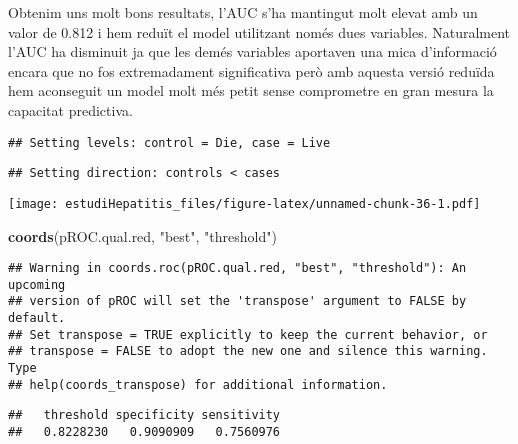 \documentclass[]{article}
\newenvironment{Shaded}{\begin{snugshade}}{\end{snugshade}}
\newcommand{\DataTypeTok}[1]{\textcolor[rgb]{0.13,0.29,0.53}{#1}}
\newcommand{\KeywordTok}[1]{\textcolor[rgb]{0.13,0.29,0.53}{\textbf{#1}}}
\newcommand{\NormalTok}[1]{#1}
\newcommand{\OperatorTok}[1]{\textcolor[rgb]{0.81,0.36,0.00}{\textbf{#1}}}
\newcommand{\OtherTok}[1]{\textcolor[rgb]{0.56,0.35,0.01}{#1}}
\newcommand{\StringTok}[1]{\textcolor[rgb]{0.31,0.60,0.02}{#1}}
\begin{document}
Obtenim uns molt bons resultats, l'AUC s'ha mantingut molt elevat amb un
valor de 0.812 i hem reduït el model utilitzant només dues variables.
Naturalment l'AUC ha disminuit ja que les demés variables aportaven una
mica d'informació encara que no fos extremadament significativa però amb
aquesta versió reduïda hem aconseguit un model molt més petit sense
comprometre en gran mesura la capacitat predictiva.

\begin{Shaded}
\end{Shaded}

\begin{verbatim}
## Setting levels: control = Die, case = Live
\end{verbatim}

\begin{verbatim}
## Setting direction: controls < cases
\end{verbatim}

\texttt{[image: estudiHepatitis\_files/figure-latex/unnamed-chunk-36-1.pdf]}

\begin{Shaded}
\begin{Highlighting}[]
\KeywordTok{coords}\NormalTok{(pROC.qual.red, }\StringTok{"best"}\NormalTok{, }\StringTok{"threshold"}\NormalTok{)}
\end{Highlighting}
\end{Shaded}

\begin{verbatim}
## Warning in coords.roc(pROC.qual.red, "best", "threshold"): An upcoming
## version of pROC will set the 'transpose' argument to FALSE by default.
## Set transpose = TRUE explicitly to keep the current behavior, or
## transpose = FALSE to adopt the new one and silence this warning. Type
## help(coords_transpose) for additional information.
\end{verbatim}

\begin{verbatim}
##   threshold specificity sensitivity 
##   0.8228230   0.9090909   0.7560976
\end{verbatim}
\end{document}
